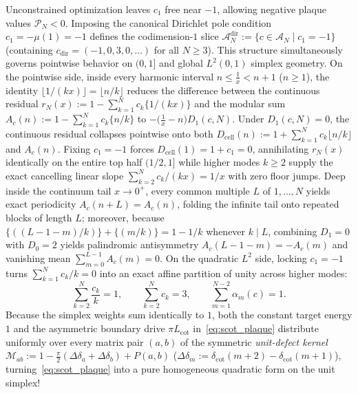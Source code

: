 \documentclass[11pt,a4paper]{article}
\theoremstyle{definition}
\begin{document}
Unconstrained optimization leaves $c_1$ free near $-1$, allowing negative plaque values $\mathcal{P}_N < 0$. Imposing the canonical Dirichlet pole condition $c_1 = -\mu(1) = -1$ defines the codimension-$1$ slice $\mathcal{A}_N^{\mathrm{dir}} := \{c \in \mathcal{A}_N \mid c_1 = -1\}$ (containing $c_{\mathrm{dir}} = (-1, 0, 3, 0, \dots)$ for all $N \ge 3$). This structure simultaneously governs pointwise behavior on $(0,1]$ and global $L^2(0,1)$ simplex geometry. On the pointwise side, inside every harmonic interval $n \le \tfrac{1}{x} < n+1$ ($n \ge 1$), the identity $\lfloor 1/(kx) \rfloor = \lfloor n/k \rfloor$ reduces the difference between the continuous residual $r_N(x) := 1 - \sum_{k=1}^N c_k \{1/(kx)\}$ and the modular sum $A_c(n) := 1 - \sum_{k=1}^N c_k \{n/k\}$ to $-\bigl(\tfrac{1}{x} - n\bigr)D_1(c,N)$. Under $D_1(c,N) = 0$, the continuous residual collapses pointwise onto both $D_{\mathrm{cell}}(n) := 1 + \sum_{k=1}^N c_k \lfloor n/k \rfloor$ and $A_c(n)$. Fixing $c_1 = -1$ forces $D_{\mathrm{cell}}(1) = 1 + c_1 = 0$, annihilating $r_N(x)$ identically on the entire top half $(1/2, 1]$ while higher modes $k \ge 2$ supply the exact cancelling linear slope $\sum_{k=2}^N c_k/(kx) = 1/x$ with zero floor jumps. Deep inside the continuum tail $x \to 0^+$, every common multiple $L$ of $1,\dots,N$ yields exact periodicity $A_c(n+L) = A_c(n)$, folding the infinite tail onto repeated blocks of length $L$; moreover, because $\{((L-1-m)/k)\} + \{(m/k)\} = 1 - 1/k$ whenever $k \mid L$, combining $D_1 = 0$ with $D_0 = 2$ yields palindromic antisymmetry $A_c(L - 1 - m) = -A_c(m)$ and vanishing mean $\sum_{m=0}^{L-1} A_c(m) = 0$. On the quadratic $L^2$ side, locking $c_1 = -1$ turns $\sum_{k=1}^N c_k / k = 0$ into an exact affine partition of unity across higher modes:
\[
\sum_{k=2}^N \frac{c_k}{k} = 1, \qquad \sum_{k=2}^N c_k = 3, \qquad \sum_{m=1}^{N-2} \alpha_m(c) = 1.
\]
Because the simplex weights sum identically to $1$, both the constant target energy $1$ and the asymmetric boundary drive $\pi L_{\mathrm{cot}}$ in~\eqref{eq:scot_plaque} distribute uniformly over every matrix pair $(a,b)$ of the symmetric \emph{unit-defect kernel} $\mathcal{M}_{ab} := 1 - \tfrac{\pi}{2}(\Delta\delta_a + \Delta\delta_b) + P(a,b)$ ($\Delta\delta_m := \delta_{\mathrm{cot}}(m+2)-\delta_{\mathrm{cot}}(m+1)$), turning~\eqref{eq:scot_plaque} into a pure homogeneous quadratic form on the unit simplex!
\end{document}
